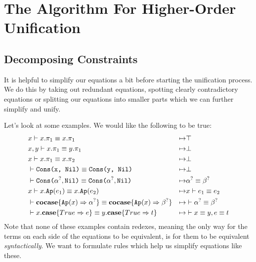 \documentclass[twoside,12pt,a4paper]{article}
\begin{document}
\section{The Algorithm For Higher-Order Unification}

\subsection{Decomposing Constraints}

It is helpful to simplify our equations a bit before starting the unification process.
We do this by taking out redundant equations, spotting clearly contradictory equations or splitting our equations into smaller parts which we can further simplify and unify.

Let's look at some examples. We would like the following to be true:
\begin{align*}
    &x \vdash x.\pi_1 \equiv x.\pi_1 &\mapsto& \top\\
    &x,y \vdash x.\pi_1 \equiv y.\pi_1 &\mapsto& \bot \\
    &x \vdash x.\pi_1 \equiv x.\pi_2 &\mapsto& \bot \\
    &\vdash \texttt{Cons(x, Nil)} \equiv \texttt{Cons(y, Nil)}
    &\mapsto& \bot\\
    &\vdash \texttt{Cons(}\alpha^?, \texttt{Nil)}\equiv\texttt{Cons(}\alpha^?, \texttt{Nil)}
    &\mapsto&\alpha^?\equiv \beta^?\\
    &x \vdash x.\texttt{Ap}(e_1)\equiv x.\texttt{Ap}(e_2) &\mapsto& x\vdash e_1\equiv e_2 \\
    &\vdash \textbf{cocase}\{\texttt{Ap}(x)\Rightarrow \alpha^?\} \equiv \textbf{cocase}\{\texttt{Ap}(x)\Rightarrow\beta^?\} 
    &\mapsto&\vdash \alpha^? \equiv \beta^?\\
    &\vdash x.\textbf{case}\{True \Rightarrow e\} \equiv y.\textbf{case}\{True \Rightarrow t\}
    &\mapsto& \vdash x\equiv y, e \equiv t
\end{align*}
Note that none of these examples contain redexes, meaning the only way for the terms on each side of the equations to be equivalent,
is for them to be equivalent \textit{syntactically}.
We want to formulate rules which help us simplify equations like these.
\end{document}
